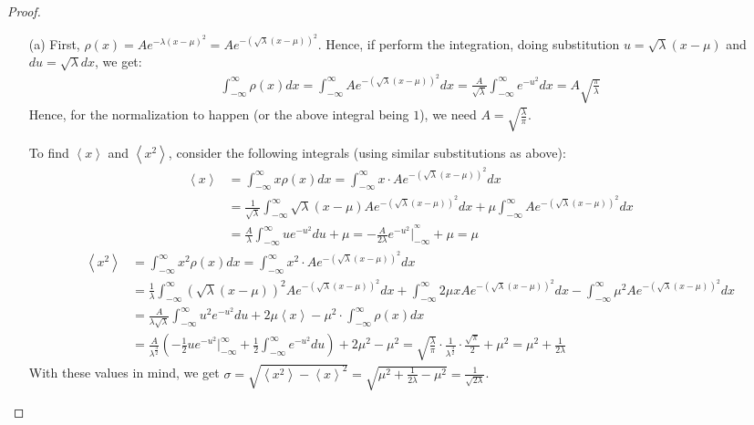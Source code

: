 \documentclass{article}
\begin{document}
\begin{proof}

    \hfil

    \begin{itemize}
        \item[(a)] First, $\rho(x)=A e^{-\lambda(x-\mu)^2} = A e^{-(\sqrt{\lambda}(x-\mu))^2}$. Hence, if perform the integration, doing substitution $u=\sqrt{\lambda}(x-\mu)$ and $du = \sqrt{\lambda} dx$, we get:
        \begin{align}
            \int_{-\infty}^{\infty}\rho(x)dx = \int_{-\infty}^{\infty}A e^{-(\sqrt{\lambda}(x-\mu))^2}dx = \frac{A}{\sqrt{\lambda}}\int_{-\infty}^{\infty}e^{-u^2}dx = A\sqrt{\frac{\pi}{\lambda}}
        \end{align}
        Hence, for the normalization to happen (or the above integral being $1$), we need $A=\sqrt{\frac{\lambda}{\pi}}$.

        \hfil

        To find $\left<x\right>$ and $\left<x^2\right>$, consider the following integrals (using similar substitutions as above):
        \begin{align}
            \left<x\right> &= \int_{-\infty}^{\infty}x\rho(x)dx = \int_{-\infty}^{\infty}x \cdot Ae^{-(\sqrt{\lambda}(x-\mu))^2}dx\\
            &= \frac{1}{\sqrt{\lambda}}\int_{-\infty}^{\infty}\sqrt{\lambda}(x-\mu)Ae^{-(\sqrt{\lambda}(x-\mu))^2}dx+\mu\int_{-\infty}^{\infty}A e^{-(\sqrt{\lambda}(x-\mu))^2}dx\\
            &= \frac{A}{\lambda}\int_{-\infty}^{\infty}ue^{-u^2}du + \mu = -\frac{A}{2\lambda}e^{-u^2}\bigg|_{-\infty}^{^\infty}+\mu = \mu
        \end{align}
        \begin{align}
            \left<x^2\right>&= \int_{-\infty}^{\infty}x^2\rho(x)dx=\int_{-\infty}^{\infty}x^2\cdot Ae^{-(\sqrt{\lambda}(x-\mu))^2}dx\\ 
            &= \frac{1}{\lambda}\int_{-\infty}^{\infty}(\sqrt{\lambda}(x-\mu))^2 Ae^{-(\sqrt{\lambda}(x-\mu))^2}dx + \int_{-\infty}^{\infty}2\mu x Ae^{-(\sqrt{\lambda}(x-\mu))^2}dx-\int_{-\infty}^{\infty}\mu^2 Ae^{-(\sqrt{\lambda}(x-\mu))^2}dx\\
            &= \frac{A}{\lambda\sqrt{\lambda}}\int_{-\infty}^{\infty}u^2 e^{-u^2}du + 2\mu\left<x\right>-\mu^2\cdot \int_{-\infty}^{\infty}\rho(x)dx\\ 
            &= \frac{A}{\lambda^\frac{3}{2}}\left(-\frac{1}{2}ue^{-u^2}\bigg|_{-\infty}^{\infty}+\frac{1}{2}\int_{-\infty}^{\infty}e^{-u^2}du\right) + 2\mu^2-\mu^2 =\sqrt{\frac{\lambda}{\pi}}\cdot\frac{1}{\lambda^\frac{3}{2}}\cdot\frac{\sqrt{\pi}}{2}+\mu^2 = \mu^2+\frac{1}{2\lambda}
        \end{align}
        With these values in mind, we get $\sigma=\sqrt{\left<x^2\right>-\left<x\right>^2}=\sqrt{\mu^2+\frac{1}{2\lambda}-\mu^2} = \frac{1}{\sqrt{2\lambda}}$.


\end{itemize}
\end{proof}
\end{document}
